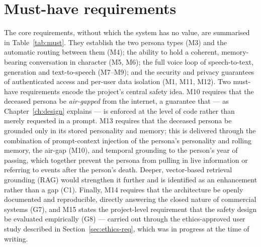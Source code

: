 \documentclass[11pt,a4paper]{report}
\begin{document}
\section{Must-have requirements}
The core requirements, without which the system has no value, are summarised in Table~\ref{tab:must}. They establish the two persona types (M3) and the automatic routing between them (M4); the ability to hold a coherent, memory-bearing conversation in character (M5, M6); the full voice loop of speech-to-text, generation and text-to-speech (M7--M9); and the security and privacy guarantees of authenticated access and per-user data isolation (M1, M11, M12). Two must-have requirements encode the project's central safety idea. M10 requires that the deceased persona be \emph{air-gapped} from the internet, a guarantee that --- as Chapter~\ref{ch:design} explains --- is enforced at the level of code rather than merely requested in a prompt. M13 requires that the deceased persona be grounded only in its stored personality and memory; this is delivered through the combination of prompt-context injection of the persona's personality and rolling memory, the air-gap (M10), and temporal grounding to the person's year of passing, which together prevent the persona from pulling in live information or referring to events after the person's death. Deeper, vector-based retrieval grounding (RAG) would strengthen it further and is identified as an enhancement rather than a gap (C1). Finally, M14 requires that the architecture be openly documented and reproducible, directly answering the closed nature of commercial systems (G7), and M15 states the project-level requirement that the safety design be evaluated empirically (G8) --- carried out through the ethics-approved user study described in Section~\ref{sec:ethics-req}, which was in progress at the time of writing.
\end{document}
